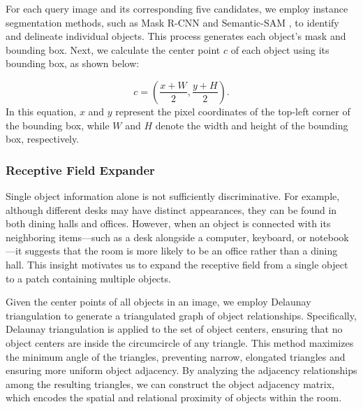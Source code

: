 For each query image and its corresponding five candidates, we employ instance segmentation methods, such as Mask R-CNN \cite{he2018maskrcnn} and Semantic-SAM \cite{li2023semanticsamsegmentrecognizegranularity}, to identify and delineate individual objects. This process generates each object's mask and bounding box. Next, we calculate the center point \(c\) of each object using its bounding box, as shown below:

\begin{equation}
    c = (\frac{x+W}{2}, \frac{y+H}{2}).
    \label{eq:center point}
\end{equation}
In this equation, \(x\) and \(y\) represent the pixel coordinates of the top-left corner of the bounding box, while \(W\) and \(H\) denote the width and height of the bounding box, respectively.

\subsubsection{Receptive Field Expander}

Single object information alone is not sufficiently discriminative. For example, although different desks may have distinct appearances, they can be found in both dining halls and offices. However, when an object is connected with its neighboring items—such as a desk alongside a computer, keyboard, or notebook—it suggests that the room is more likely to be an office rather than a dining hall. This insight motivates us to expand the receptive field from a single object to a patch containing multiple objects.

Given the center points of all objects in an image, we employ Delaunay triangulation \cite{10.5555/1370949} to generate a triangulated graph of object relationships. Specifically, Delaunay triangulation is applied to the set of object centers, ensuring that no object centers are inside the circumcircle of any triangle. This method maximizes the minimum angle of the triangles, preventing narrow, elongated triangles and ensuring more uniform object adjacency. By analyzing the adjacency relationships among the resulting triangles, we can construct the object adjacency matrix, which encodes the spatial and relational proximity of objects within the room.


